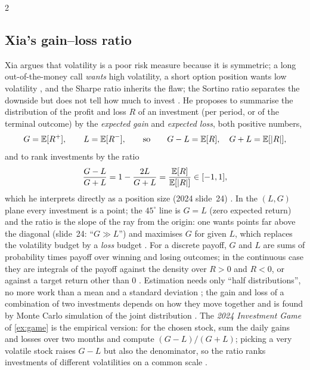 \begin{paracol}{2}
\subsection{Xia's gain--loss ratio}
Xia argues that volatility is a poor risk measure because it is symmetric; a long out-of-the-money call
\emph{wants} high volatility, a short option position wants low volatility , and the Sharpe ratio
inherits the flaw; the Sortino ratio separates the downside but does not tell how much to invest
. He proposes to summarise the distribution of the profit and loss $R$ of an investment
(per period, or of the terminal outcome) by the \emph{expected gain} and \emph{expected loss}, both positive numbers,
\[
  G=\mathbb{E}[R^+],\qquad L=\mathbb{E}[R^-],\qquad \text{so}\qquad G-L=\mathbb{E}[R],\quad G+L=\mathbb{E}[|R|] ,
\]
and to rank investments by the ratio
\begin{equation}\label{ch10:eq-gl}
  \frac{G-L}{G+L}=1-\frac{2L}{G+L}=\frac{\mathbb{E}[R]}{\mathbb{E}[|R|]}\in[-1,1],
\end{equation}
which he interprets directly as a position size (2024 slide~24) . In the
$(L,G)$ plane every investment is a point; the $45^\circ$ line is $G=L$ (zero expected return) and the
ratio is the slope of the ray from the origin: one wants points far above the diagonal
(slide~24: ``$G\gg L$'') and maximises $G$ for given $L$, which replaces the volatility budget by a
\emph{loss} budget . For a discrete payoff, $G$ and $L$ are sums of probability
times payoff over winning and losing outcomes; in the continuous case they are integrals of the payoff against the
density over $R>0$ and $R<0$, or against a target return other than $0$ . Estimation needs only
``half distributions'', no more work than a mean and a standard deviation ;
the gain and loss of a combination of two investments depends on how they move together and is found by
Monte Carlo simulation of the joint distribution . The \emph{2024 Investment Game} of \cref{ex:game}
is the empirical version: for the chosen stock, sum the daily gains and losses over two months and compute
$(G-L)/(G+L)$; picking a very volatile stock raises $G-L$ but also the denominator, so the ratio ranks
investments of different volatilities on a common scale .


\end{paracol}

